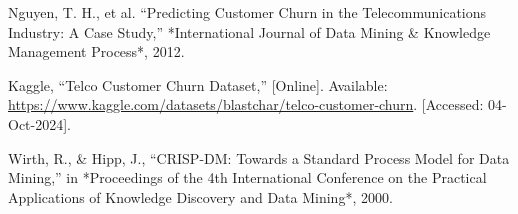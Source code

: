 \documentclass[12pt]{article}
\begin{document}
\begin{thebibliography}{9}
Nguyen, T. H., et al. ``Predicting Customer Churn in the Telecommunications Industry: A Case Study,'' *International Journal of Data Mining & Knowledge Management Process*, 2012.

Kaggle, ``Telco Customer Churn Dataset,'' [Online]. Available: \url{https://www.kaggle.com/datasets/blastchar/telco-customer-churn}. [Accessed: 04-Oct-2024].

Wirth, R., & Hipp, J., ``CRISP-DM: Towards a Standard Process Model for Data Mining,'' in *Proceedings of the 4th International Conference on the Practical Applications of Knowledge Discovery and Data Mining*, 2000.

\end{thebibliography}
\end{document}
